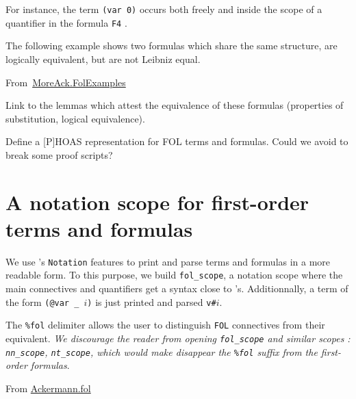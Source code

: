 For instance, the term \texttt{(var 0)}
occurs both freely and  inside the scope of a quantifier in the
formula \texttt{F4} .

The following example shows two formulas which share the same structure, are logically equivalent, but are not Leibniz equal.



\vspace{4pt}

\noindent From~\href{../theories/html/hydras.MoreAck.FolExamples.html}{MoreAck.FolExamples}
  


  \begin{todo}
   Link to the lemmas which attest the equivalence of these formulas (properties of substitution, logical equivalence).
  \end{todo}


  \begin{project}
 Define a [P]HOAS representation for FOL terms and formulas.
Could we avoid  to  break some proof scripts?   
  \end{project}



\section{A notation scope for first-order terms and formulas}
\label{sect:fol-notations}


 We use \coq's \texttt{Notation} features to print and parse terms and formulas  in a more readable form.
To this purpose, we build \texttt{fol\_scope}, a  notation scope
where the main connectives and quantifiers get a syntax close to \coq's.  Additionnally, a term of the form \texttt{(@var \_ $i$)} is
just printed and parsed  \texttt{v\#$i$}.



The \texttt{\%fol} delimiter 
allows the user to distinguish \texttt{FOL} connectives from their \coq equivalent.
\emph{We discourage the reader from \emph{opening} \texttt{fol\_scope} and similar scopes : \texttt{nn\_scope}, \texttt{nt\_scope}, which would make disappear the \texttt{\%fol} suffix from the first-order formulas}.


\vspace{6pt}

\noindent From \href{../theories/html/hydras.Ackermann.fol.html}{Ackermann.fol}

